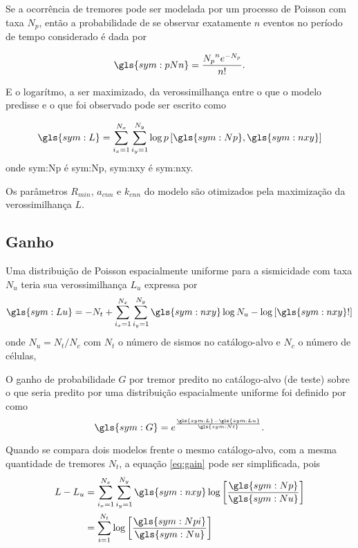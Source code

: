Se a ocorrência de tremores pode ser modelada por um processo de Poisson com taxa $N_p$, 
então a probabilidade de se observar exatamente $n$ eventos no período de tempo considerado é dada por

\begin{equation}
	\ensuremath{
		\gls{sym:pNn} = \frac{{N_p}^n e^{-N_p}}{n!}.
	}
	\label{eq:loglik}
\end{equation}

E o logarítmo, a ser maximizado, da verossimilhança entre 
o que o modelo predisse e o que foi observado 
pode ser escrito como

\begin{equation}
	\ensuremath{
		\gls{sym:L} = \sum_{i_x=1}^{N_x}\sum_{i_y=1}^{N_y}\log p\left[  \gls{sym:Np}, \gls{sym:nxy}  \right]
	}
	\label{eq:loglik}
\end{equation}
onde \gls{sym:Np} é \glsdesc{sym:Np},
	\gls{sym:nxy} é \glsdesc{sym:nxy}.

Os parâmetros $R_{min}$, $a_{cnn}$ e $k_{cnn}$ do modelo são otimizados 
pela maximização da verossimilhança $L$.

\subsection{Ganho}

Uma distribuição de Poisson espacialmente uniforme para a sismicidade com taxa $N_u$
teria sua verossimilhança $L_u$ expressa por
\begin{equation}
	\ensuremath{
		\gls{sym:Lu} = -N_t + 
		\sum_{i_x = 1}^{N_x}\sum_{i_y=1}^{N_y}
		\gls{sym:nxy}\log N_u - \log \left[ \gls{sym:nxy}! \right]
	}
	\label{eq:lu}
\end{equation}
onde $N_u = N_t/N_c$ com $N_t$ o número de sismos no catálogo-alvo e $N_c$ o número de células, 


O ganho de probabilidade $G$ por tremor predito no catálogo-alvo (de teste)
sobre o que seria predito por uma distribuição espacialmente uniforme 
foi definido por \citet{kagan_knopoff_1977} como
\begin{equation}
	\ensuremath{
		\gls{sym:G} = e^{ \frac{\gls{sym:L} - \gls{sym:Lu}}{\gls{sym:Nt}}   }.
	}
	\label{eq:gain}
\end{equation}

Quando se compara dois modelos frente o mesmo catálogo-alvo, com a mesma quantidade de tremores $N_t$,
a equação \eqref{eq:gain} pode ser simplificada, pois 
\begin{equation}
	\ensuremath{
	\begin{align}
		L - L_u & = \sum_{i_x = 1}^{N_x}\sum_{i_y=1}^{N_y}
				  \gls{sym:nxy}\log \left[ \frac{\gls{sym:Np}}{\gls{sym:Nu}} \right] \\
				& = \sum_{i = 1}^{N_t}\log \left[\frac{\gls{sym:Npi}}{\gls{sym:Nu}} \right]
	\end{align}}
	\label{eq:llu}
\end{equation}

